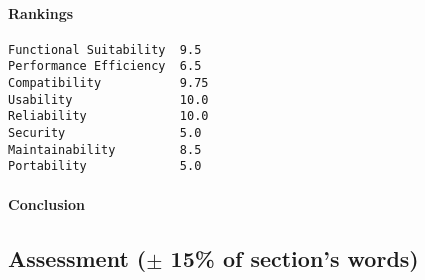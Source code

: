\documentclass{article}
\begin{document}
\paragraph*{Rankings}
\begin{verbatim}
Functional Suitability  9.5
Performance Efficiency  6.5
Compatibility           9.75
Usability               10.0
Reliability             10.0
Security                5.0
Maintainability         8.5
Portability             5.0
\end{verbatim}

\paragraph*{Conclusion}

\subsection{Assessment ($\pm$ 15\% of section's words)}
\end{document}
